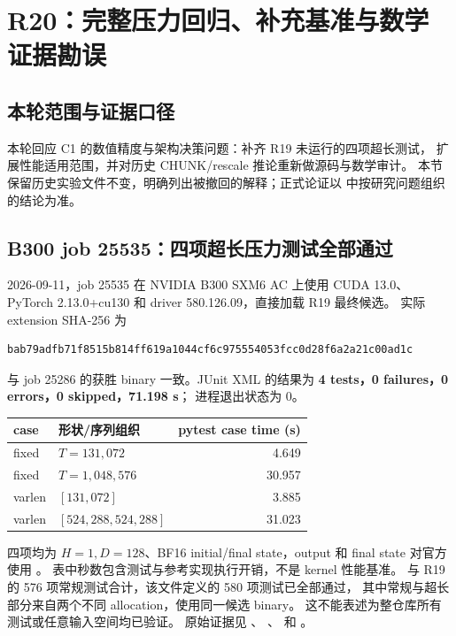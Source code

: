 \section{R20：完整压力回归、补充基准与数学证据勘误}

\subsection{本轮范围与证据口径}

本轮回应 C1 的数值精度与架构决策问题：补齐 R19 未运行的四项超长测试，
扩展性能适用范围，并对历史 CHUNK/rescale 推论重新做源码与数学审计。
本节保留历史实验文件不变，明确列出被撤回的解释；正式论证以
 中按研究问题组织的结论为准。

\subsection{B300 job 25535：四项超长压力测试全部通过}

2026-09-11，job 25535 在 NVIDIA B300 SXM6 AC 上使用 CUDA 13.0、
PyTorch 2.13.0+cu130 和 driver 580.126.09，直接加载 R19 最终候选。
实际 extension SHA-256 为
\begin{lstlisting}
bab79adfb71f8515b814ff619a1044cf6c975554053fcc0d28f6a2a21c00ad1c
\end{lstlisting}
与 job 25286 的获胜 binary 一致。JUnit XML 的结果为
\textbf{4 tests，0 failures，0 errors，0 skipped，71.198 s}；
进程退出状态为 0。

\begin{center}\small
\begin{tabular}{@{}llr@{}}
\toprule
case & 形状/序列组织 & pytest case time (s)\\
\midrule
fixed & $T=131{,}072$ & 4.649\\
fixed & $T=1{,}048{,}576$ & 30.957\\
varlen & $[131{,}072]$ & 3.885\\
varlen & $[524{,}288,524{,}288]$ & 31.023\\
\bottomrule
\end{tabular}
\end{center}

四项均为 $H=1,D=128$、BF16 initial/final state，output 和 final state
对官方  使用 。
表中秒数包含测试与参考实现执行开销，不是 kernel 性能基准。
与 R19 的 576 项常规测试合计，该文件定义的 580 项测试已全部通过，
其中常规与超长部分来自两个不同 allocation，使用同一候选 binary。
这不能表述为整仓库所有测试或任意输入空间均已验证。
原始证据见 、
、 和 。

